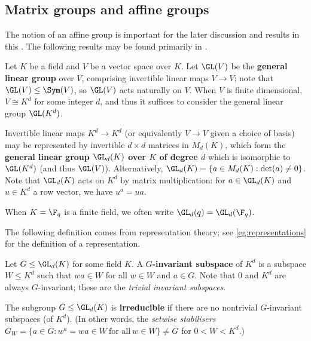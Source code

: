 \subsection{Matrix groups and affine groups}

The notion of an affine group is important for the later discussion and results in this \thesis{}. The following results may be found primarily in \cite{dixon_mortimer_perm_groups1996}.

\begin{definition}\label{def:gl_group}
    Let $K$ be a field and $V$ be a vector space over $K$. Let $\GL(V)$ be the \textbf{general linear group} over $V$, comprising invertible linear maps $V \to V$; note that $\GL(V) \leq \Sym(V)$, so $\GL(V)$ acts naturally on $V$. When $V$ is finite dimensional, $V \cong K^d$ for some integer $d$, and thus it suffices to consider the general linear group $\GL(K^d)$.

    Invertible linear maps $K^d \to K^d$ (or equivalently $V \to V$ given a choice of basis) may be represented by invertible $d \times d$ matrices in $M_d(K)$, which form the \textbf{general linear group $\GL_d(K)$ over $K$ of degree $d$} which is isomorphic to $\GL(K^d)$ (and thus $\GL(V)$). Alternatively, $\GL_d(K) = \{a \in M_d(K) : \det(a) \neq 0\}$. Note that $\GL_d(K)$ acts on $K^d$ by matrix multiplication: for $a \in \GL_d(K)$ and $u \in K^d$ a row vector, we have $u^a = ua$.

    When $K = \F_q$ is a finite field, we often write $\GL_d(q) = \GL_d(\F_q)$.
\end{definition}

The following definition comes from representation theory; see \autoref{eg:representations} for the definition of a representation.

\begin{definition}\label{def:irred_subgroup}
    Let $G \leq \GL_d(K)$ for some field $K$. A \textbf{$G$-invariant subspace} of $K^d$ is a subspace $W \leq K^d$ such that $wa \in W$ for all $w \in W$ and $a \in G$. Note that $0$ and $K^d$ are always $G$-invariant; these are the \textit{trivial invariant subspaces}.

    The subgroup $G \leq \GL_d(K)$ is \textbf{irreducible} if there are no nontrivial $G$-invariant subspaces (of $K^d$). (In other words, the \textit{setwise stabilisers} $G_W = \{a \in G : w^a = wa \in W\ \text{for all}\ w \in W\} \neq G$ for $0 < W < K^d$.)
\end{definition}

